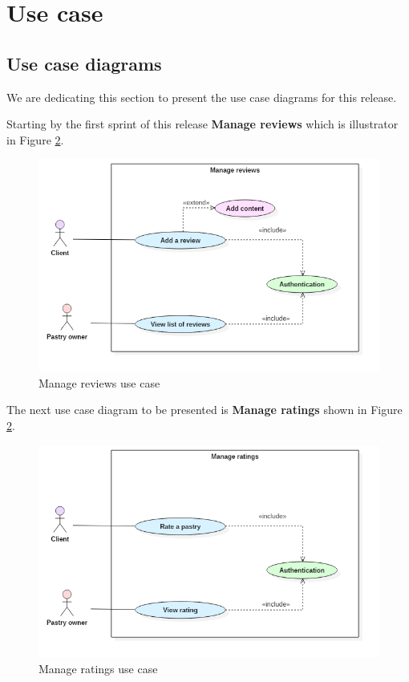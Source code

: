 \documentclass[12pt,a4paper]{report}
\begin{document}
	\section{Use case}
		\subsection{Use case diagrams}
		We are dedicating this section to present the use case diagrams for this release.\par 
		Starting by the first sprint of this release \textbf{Manage reviews} which is illustrator in Figure \ref{ratings-usecase}.
		\begin{figure}[H]
			
			\centering
			\includegraphics[width=5in,keepaspectratio]{manageReviews.png}
			\caption{Manage reviews use case}
			\label{reviews-usecase}
		\end{figure}
	The next use case diagram to be presented is \textbf{Manage ratings} shown in Figure \ref{ratings-usecase}.
	\begin{figure}[H]
		
		\centering
		\includegraphics[width=5in,keepaspectratio]{manageratings.png}
		\caption{Manage ratings use case}
		\label{ratings-usecase}
	\end{figure}
\end{document}
